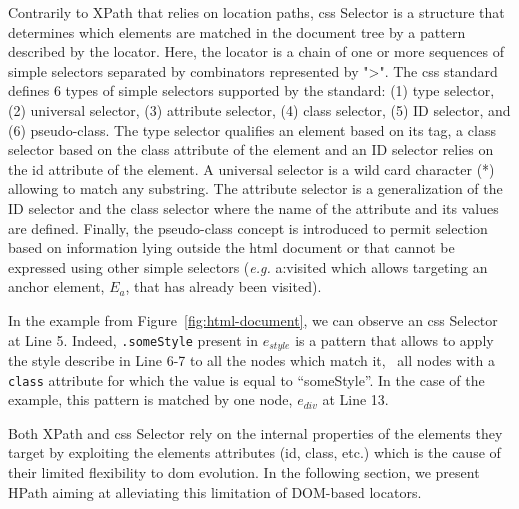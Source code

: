 Contrarily to XPath that relies on location paths, \gls{css} Selector is a structure that determines which elements are matched in the document tree by a pattern described by the locator. Here, the locator is a chain of one or more sequences of simple selectors separated by combinators\cite{W3C2018} represented by ">". The \gls{css} standard defines 6 types of simple selectors supported by the standard: (1) type selector, (2) universal selector, (3) attribute selector, (4) class selector, (5) ID selector, and (6) pseudo-class. The type selector qualifies an element based on its tag, a class selector based on the class attribute of the element and an ID selector relies on the id attribute of the element. A universal selector is a wild card character (*) allowing to match any substring. The attribute selector is a generalization of the ID selector and the class selector where the name of the attribute and its values are defined. Finally, the pseudo-class concept is introduced to permit selection based on information lying outside the \gls{html} document or that cannot be expressed using other simple selectors (\emph{e.g.} a:visited which allows targeting an anchor element, $E_a$, that has already been visited).

In the example from Figure~\ref{fig:html-document}, we can observe an \gls{css} Selector at Line 5. Indeed, \texttt{.someStyle} present in $e_{style}$ is a pattern that allows to apply the style describe in Line 6-7 to all the nodes which match it, \ie\ all nodes with a \texttt{class} attribute for which the value is equal to ``someStyle''. In the case of the example, this pattern is matched by one node, $e_{div}$ at Line 13. 

Both XPath and \gls{css} Selector rely on the internal properties of the elements they target by exploiting the elements attributes (id, class, etc.) which is the cause of their limited flexibility to \gls{dom} evolution. In the following section, we present HPath aiming at alleviating this limitation of DOM-based locators.